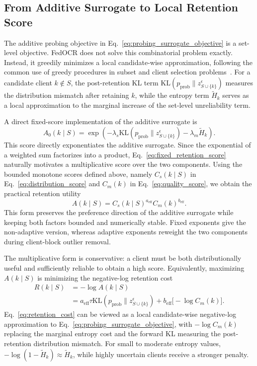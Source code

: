 ﻿\documentclass[conference]{IEEEtran}
\theoremstyle{definition}
\theoremstyle{remark}
\begin{document}
\subsection{From Additive Surrogate to Local Retention Score}
\label{subsec:local_retention_score}

The additive probing objective in Eq.~\eqref{eq:probing_surrogate_objective} is a set-level objective.
FedOCR does not solve this combinatorial problem exactly.
Instead, it greedily minimizes a local candidate-wise approximation, following the common use of greedy procedures in subset and client selection problems~\cite{nemhauser1978submodular,krause2014submodular,sener2018coreset,zhang2023dpp}.
For a candidate client $k\notin S$, the post-retention KL term $\mathrm{KL}(p_{\mathrm{prob}}\|z_{S\cup\{k\}}^\epsilon)$ measures the distribution mismatch after retaining $k$, while the entropy term $\widetilde H_k$ serves as a local approximation to the marginal increase of the set-level unreliability term.

A direct fixed-score implementation of the additive surrogate is
\begin{equation}
\label{eq:fixed_retention_score}
A_0(k\mid S)
=
\exp
\left(
-\lambda_s
\mathrm{KL}
\left(
p_{\mathrm{prob}}\|z_{S\cup\{k\}}^\epsilon
\right)
-
\lambda_m\widetilde H_k
\right).
\end{equation}
This score directly exponentiates the additive surrogate. Since the exponential
of a weighted sum factorizes into a product, Eq.~\eqref{eq:fixed_retention_score}
naturally motivates a multiplicative score over the two components. Using the
bounded monotone scores defined above, namely $C_s(k\mid S)$ in
Eq.~\eqref{eq:distribution_score} and $C_m(k)$ in Eq.~\eqref{eq:quality_score},
we obtain the practical retention utility
\begin{equation}
\label{eq:adaptive_utility}
A(k\mid S)
=
C_s(k\mid S)^{a_{\mathrm{eff}}}
C_m(k)^{b_{\mathrm{eff}}}.
\end{equation}
This form preserves the preference direction of the additive surrogate while
keeping both factors bounded and numerically stable. Fixed exponents give the
non-adaptive version, whereas adaptive exponents reweight the two components
during client-block outlier removal.


The multiplicative form is conservative: a client must be both distributionally useful and sufficiently reliable to obtain a high score.
Equivalently, maximizing $A(k\mid S)$ is minimizing the negative-log retention cost
\begin{align}
\label{eq:retention_cost}
R(k\mid S)
&=
-\log A(k\mid S)\\
&=
a_{\mathrm{eff}}\tau
\mathrm{KL}\!\left(p_{\mathrm{prob}}\|z_{S\cup\{k\}}^\epsilon\right)
+
b_{\mathrm{eff}}\big[-\log C_m(k)\big].
\end{align}
Eq.~\eqref{eq:retention_cost} can be viewed as a local candidate-wise negative-log approximation to Eq.~\eqref{eq:probing_surrogate_objective}, with $-\log C_m(k)$ replacing the marginal entropy cost and the forward KL measuring the post-retention distribution mismatch.
For small to moderate entropy values, $-\log(1-\widetilde H_k)\approx \widetilde H_k$, while highly uncertain clients receive a stronger penalty.
\end{document}
